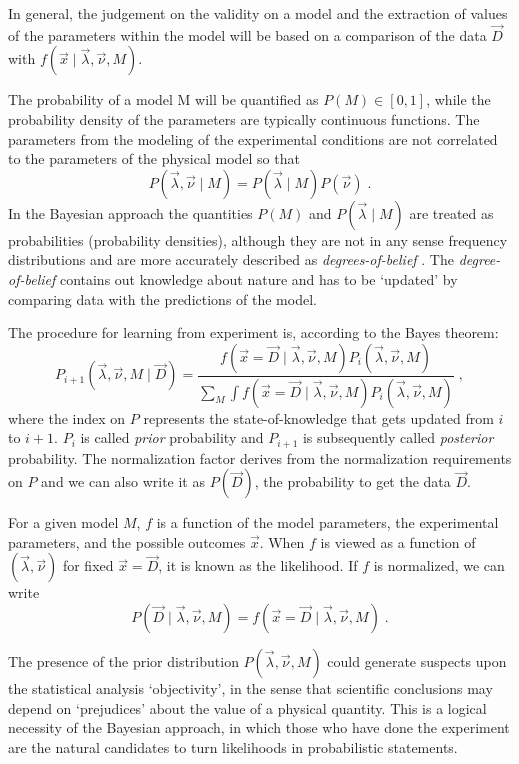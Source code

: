 In general, the judgement on the validity on a model and the extraction of values of the parameters within the model will be based on a comparison of the data $\vec{D}$ with $f(\vec{x}\mid\vec{\lambda},\vec{\nu},M)$.

 The probability of a model M will be quantified as $P(M)\in[0,1]$, while the probability density of the parameters are typically continuous functions. The parameters from the modeling of the experimental conditions are not correlated to the parameters of the physical model so that
\[P(\vec{\lambda},\vec{\nu}\mid M)=P(\vec{\lambda}\mid M)P(\vec{\nu})\;.\]
In the Bayesian approach the quantities $P(M)$ and $P(\vec{\lambda}\mid M)$ are treated as probabilities (probability densities), although they are not in any sense frequency distributions and are more accurately described as \emph{degrees-of-belief} \cite{bayesbook}. The \emph{degree-of-belief} contains out knowledge about nature and has to be `updated' by comparing data with the predictions of the model.

The procedure for learning from experiment is, according to the Bayes theorem:
\[P_{i+1}(\vec{\lambda},\vec{\nu},M\mid\vec{D})=\frac{f(\vec{x}=\vec{D}\mid\vec{\lambda},\vec{\nu},M)P_i(\vec{\lambda},\vec{\nu},M)}{\sum_M\int f(\vec{x}=\vec{D}\mid\vec{\lambda},\vec{\nu},M)P_i(\vec{\lambda},\vec{\nu},M)}\;,\]
where the index on $P$ represents the state-of-knowledge that gets updated from $i$ to $i+1$. $P_i$ is called \emph{prior} probability and $P_{i+1}$ is subsequently called \emph{posterior} probability. The normalization factor derives from the normalization requirements on $P$ and we can also write it as $P(\vec{D})$, the probability to get the data $\vec{D}$.

For a given model $M$, $f$ is a function of the model parameters, the experimental parameters, and the possible outcomes $\vec{x}$. When $f$ is viewed as a function of $(\vec{\lambda},\vec{\nu})$ for fixed $\vec{x}=\vec{D}$, it is known as the likelihood. If $f$ is normalized, we can write
\[P(\vec{D}\mid\vec{\lambda},\vec{\nu},M)=f(\vec{x}=\vec{D}\mid\vec{\lambda},\vec{\nu},M)\;.\]

 The presence of the prior distribution $P(\vec{\lambda},\vec{\nu},M)$ could generate suspects upon the statistical analysis `objectivity', in the sense that scientific conclusions may depend on `prejudices' about the value of a physical quantity. This is a logical necessity of the Bayesian approach, in which those who have done the experiment are the natural candidates to turn likelihoods in probabilistic statements.


